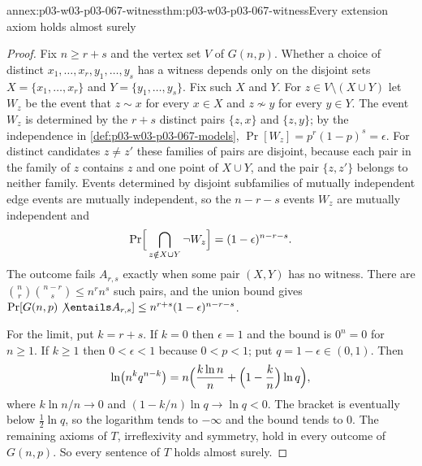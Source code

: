 \begin{annexitem}{annex:p03-w03-p03-067-witness}{thm:p03-w03-p03-067-witness}{Every extension axiom holds almost surely}
\begin{proof}
Fix \(n\geq r+s\) and the vertex set \(V\) of \(G(n,p)\).  Whether a choice
of distinct \(x_1,\ldots,x_r,y_1,\ldots,y_s\) has a witness depends only on
the disjoint sets \(X=\{x_1,\ldots,x_r\}\) and \(Y=\{y_1,\ldots,y_s\}\).  Fix
such \(X\) and \(Y\).  For \(z\in V\setminus(X\cup Y)\) let \(W_z\) be the event
that \(z\sim x\) for every \(x\in X\) and \(z\not\sim y\) for every \(y\in Y\).
The event \(W_z\) is determined by the \(r+s\) distinct pairs \(\{z,x\}\) and
\(\{z,y\}\); by the independence in \cref{def:p03-w03-p03-067-models},
\(\Pr[W_z]=p^r(1-p)^s=\epsilon\).  For distinct candidates \(z\neq z'\) these
families of pairs are disjoint, because each pair in the family of \(z\)
contains \(z\) and one point of \(X\cup Y\), and the pair \(\{z,z'\}\) belongs
to neither family.  Events determined by disjoint subfamilies of mutually
independent edge events are mutually independent, so the \(n-r-s\) events
\(W_z\) are mutually independent and
\[
 \Pr\Bigl[\,\bigcap_{z\notin X\cup Y}\neg W_z\Bigr]=(1-\epsilon)^{n-r-s}.
\]
The outcome fails \(A_{r,s}\) exactly when some pair \((X,Y)\) has no witness.
There are \(\binom nr\binom{n-r}s\leq n^rn^s\) such pairs, and the union bound
gives \(\Pr[G(n,p)\not\entails A_{r,s}]\leq n^{r+s}(1-\epsilon)^{n-r-s}\).

For the limit, put \(k=r+s\).  If \(k=0\) then \(\epsilon=1\) and the bound is
\(0^n=0\) for \(n\geq1\).  If \(k\geq1\) then \(0<\epsilon<1\) because
\(0<p<1\); put \(q=1-\epsilon\in(0,1)\).  Then
\[
 \ln\bigl(n^kq^{n-k}\bigr)
 =n\Bigl(\frac{k\ln n}{n}+\Bigl(1-\frac kn\Bigr)\ln q\Bigr),
\]
where \(k\ln n/n\to0\) and \((1-k/n)\ln q\to\ln q<0\).  The bracket is
eventually below \(\tfrac12\ln q\), so the logarithm tends to \(-\infty\) and
the bound tends to \(0\).  The remaining axioms of \(T\), irreflexivity and
symmetry, hold in every outcome of \(G(n,p)\).  So every sentence of \(T\)
holds almost surely.
\end{proof}
\end{annexitem}


